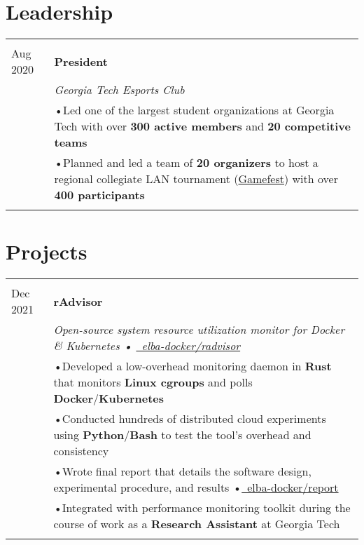 \documentclass[a4paper,11pt]{article}
\newenvironment{rsection}[1]
  {
    \section{#1}
    \begin{tabular}{>{\raggedleft\arraybackslash}p{\lcolwidth}|p{\rcolwidth}}
   } {
    \\\multicolumn{2}{c}{} \\[-10pt]
    \end{tabular}
  }
\newcommand{\rheader}[2]{
    \multirow[t]{2}{*}{
        \begin{minipage}[t]{\dimexpr \lcolwidth - 0.1cm}
            \begin{flushright}
                \textsc{#1}
            \end{flushright}
        \end{minipage}
    } & \textbf{#2}
}
\newcommand{\rdesc}[1]{
  \\[-2pt]&\small{\emph{#1}\vspace{1pt} }
}
\newcommand{\ritem}[2][ •\hspace{3pt}]{\\[-2pt]& \footnotesize{#1#2}}
\newcommand{\rdot}{\xspace\hspace{0pt}•\hspace{3pt}\xspace}
\begin{document}
\begin{rsection}{Leadership}
  \rheader{July 2019 -\\[-1pt] Aug 2020}{President}
  \rdesc{Georgia Tech Esports Club}
  \ritem{Led one of the largest student organizations at Georgia Tech
    with over \textbf{300 active members} and \textbf{20 competitive teams}}
  \ritem{Planned and led a team of \textbf{20 organizers} to host a regional
    collegiate LAN tournament
    (\href{https://web.archive.org/web/20201111230854/https://gamefest.gg/}{Gamefest})
    with over \textbf{400 participants}}
\end{rsection}
\vspace{\sectionvspace}


\begin{rsection}{Projects}
  \rheader{Feb 2020 -\\[-1pt] Dec 2021}{rAdvisor}
  \rdesc{Open-source system resource utilization monitor for Docker \& Kubernetes
    {\normalfont \rdot
    \href{https://github.com/elba-docker/radvisor}{\faGithub\ elba-docker/radvisor}}}
  \ritem{Developed a low-overhead monitoring daemon in \textbf{Rust}
    that monitors \textbf{Linux cgroups} and polls \textbf{Docker}/\textbf{Kubernetes}}
  \ritem{Conducted hundreds of distributed cloud experiments
    using \textbf{Python}/\textbf{Bash} to test the tool's overhead and consistency}
  \ritem{Wrote final report that details the software design, experimental procedure, and results
    \rdot \href{https://github.com/elba-docker/report}{\faGithub\ elba-docker/report}}
  \ritem{Integrated with performance monitoring toolkit during the course of work
    as a \textbf{Research Assistant} at Georgia Tech}
\end{rsection}
\end{document}
